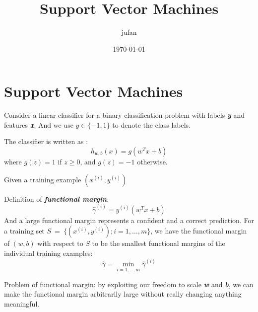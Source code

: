 \documentclass{article}
\begin{document}
\title{Support Vector Machines}\author{jufan}\date{\today}
\maketitle
\tableofcontents

\section{Support Vector Machines}
Consider a linear classifier for a binary classification problem with labels \emph{\textbf{y}} and features \emph{\textbf{x}}. And we use $y\in \{-1,1\}$ to denote the class labels.

The classifier is written as :
\begin{equation*}
h_{w,b}(x)=g(w^Tx+b)
\end{equation*}
where $g(z)=1$ if $z\geq0$, and $g(z)=-1$ otherwise.

Given a training example $(x^{(i)},y^{(i)})$ 

Definition of \emph{\textbf{functional margin}}:
\begin{equation*}
\hat{\gamma}^{(i)}=y^{(i)}(w^Tx+b)
\end{equation*}
And a large functional margin represents a confident and a correct prediction.
For a training set $S\ =\ \{(x^{(i)},y^{(i)});i=1,\ldots,m\}$, we have the functional margin of $(w,b)$ with respect to $S$ to be the smallest functional margins of the individual training examples:
\begin{equation*}
\hat{\gamma}=\min_{i=1,\ldots,m}\hat{\gamma}^{(i)}
\end{equation*}

Problem of functional margin: by exploiting our freedom to scale \emph{\textbf{w}} and \emph{\textbf{b}}, we can make the functional margin arbitrarily large without really changing anything meaningful.
\end{document}
